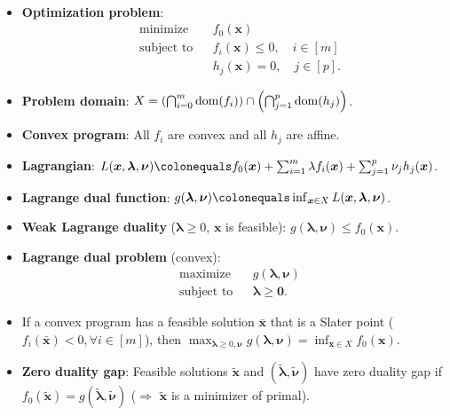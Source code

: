 \documentclass[8pt,a4paper]{extarticle}
\newcommand{\lft}{\mathopen{}\mathclose\bgroup\left}
\newcommand{\rgt}{\aftergroup\egroup\right}
\renewcommand{\vec}[1]{\bm{#1}}
\newcommand{\dom}[1]{\mathrm{dom}(#1)}
\newenvironment{topic}[1]
{\textbf{\sffamily \colorbox{black}{\rlap{\textbf{\textcolor{white}{#1}}}\hspace{\linewidth}\hspace{-2\fboxsep}}} \\ \vspace{0.2cm}}
{}
\begin{document}
\begin{multicols*}{2}
    \begin{topic}{Non-linear programming}
        \begin{itemize}
            \item \textbf{Optimization problem}:
                  \begin{align*}
                       & \text{minimize}   &  & f_0(\vec{x})                         \\
                       & \text{subject to} &  & f_i(\vec{x}) \leq 0, \quad i \in [m] \\
                       &                   &  & h_j(\vec{x}) = 0, \quad j \in [p].
                  \end{align*}
            \item \textbf{Problem domain}: $X = \lft( \bigcap_{i=0}^m \dom{f_i} \rgt) \cap \lft( \bigcap_{j=1}^p \dom{h_j} \rgt)$.
            \item \textbf{Convex program}: All $f_i$ are convex and all $h_j$ are affine.
            \item \textbf{Lagrangian}: $L(\vec{x}, \vec{\lambda}, \vec{\nu}) \colonequals f_0(\vec{x}) + \sum_{i=1}^{m} \lambda f_i(\vec{x}) + \sum_{j=1}^{p} \nu_j h_j(\vec{x})$.
            \item \textbf{Lagrange dual function}: $g(\vec{\lambda}, \vec{\nu}) \colonequals \inf_{\vec{x} \in X} L(\vec{x}, \vec{\lambda}, \vec{\nu})$.
            \item \textbf{Weak Lagrange duality} ($\vec{\lambda} \geq 0$, $\vec{x}$ is feasible): $g(\vec{\lambda}, \vec{\nu}) \leq f_0(\vec{x})$.
            \item \textbf{Lagrange dual problem} (convex):
                  \begin{align*}
                       & \text{maximize}   &  & g(\vec{\lambda}, \vec{\nu}) \\
                       & \text{subject to} &  & \vec{\lambda} \geq \vec{0}.
                  \end{align*}
            \item If a convex program has a feasible solution $\bar{\vec{x}}$ that is a Slater point
                  ($f_i(\bar{\vec{x}}) < 0, \forall i \in[m]$), then $\max_{\vec{\lambda} \geq 0, \vec{\nu}}
                      g(\vec{\lambda}, \vec{\nu}) = \inf_{\vec{x} \in X} f_0(\vec{x})$.
            \item \textbf{Zero duality gap}: Feasible solutions $\tilde{\vec{x}}$ and $(\tilde{\vec{\lambda}}, \tilde{\vec{\nu}})$ have zero duality gap if $f_0(\tilde{\vec{x}}) = g(\tilde{\vec{\lambda}}, \tilde{\vec{\nu}})$ ($\Rightarrow$ $\tilde{\vec{x}}$ is a minimizer of primal).

\end{itemize}
\end{topic}
\end{multicols*}
\end{document}
